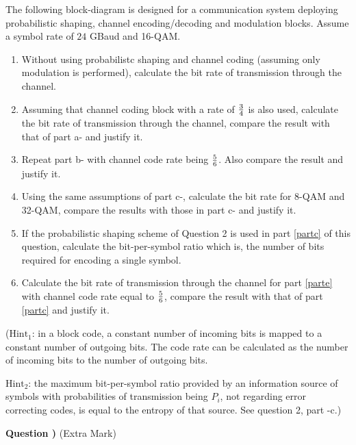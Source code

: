 \documentclass[10pt,letterpaper]{article}
\newcounter{QuestionNumber}
\newcommand{\Q}{
\textbf{Question \theQuestionNumber)}
\stepcounter{QuestionNumber}
}
\newcommand{\nl}{\newline\newline}
\begin{document}
The following block-diagram is designed for a communication system deploying probabilistic shaping, channel encoding/decoding and modulation blocks. Assume a symbol rate of $24$ GBaud and 16-QAM.
\begin{enumerate}[label=\alph*-]
\item
Without using probabilistc shaping and channel coding (assuming only modulation is performed), calculate the bit rate of transmission through the channel.
\item
Assuming that channel coding block with a rate of $3\over 4$ is also used, calculate the bit rate of transmission through the channel, compare the result with that of part a- and justify it.
\item
Repeat part b- with channel code rate being $5\over 6$. Also compare the result and justify it.
\label{partc}
\item
Using the same assumptions of part c-, calculate the bit rate for 8-QAM and 32-QAM, compare the results with those in part c- and justify it.
\item
\label{parte}
If the probabilistic shaping scheme of Question 2 is used in part \ref{partc} of this question,  calculate the  bit-per-symbol ratio which is, the number of bits required for encoding a single symbol.
\item
Calculate the bit rate of transmission through the channel for part \ref{parte} with channel code rate equal to $5\over 6$, compare the result with that of part \ref{partc} and justify it.
\end{enumerate}
($\text{Hint}_1$: in a block code, a constant number of incoming bits is mapped to a constant number of outgoing bits. The code rate can be calculated as the number of incoming bits to the number of outgoing bits.

$\text{Hint}_2$: the maximum bit-per-symbol ratio provided by an information source of symbols with probabilities of transmission being $P_i$, not regarding error correcting codes, is equal to the entropy of that source. See question 2, part -c.)
\nl
\Q (Extra Mark)
\end{document}
